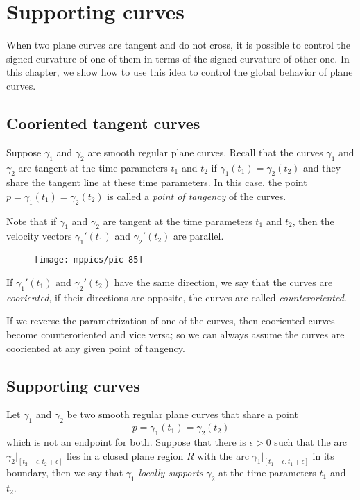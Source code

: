 \chapter{Supporting curves}
\label{chap:supporting-curves}

When two plane curves are tangent and do not cross, it is possible to control the signed curvature of one of them in terms of the signed curvature of other one.
In this chapter, we show how to use this idea to control the global behavior of plane curves.

\section{Cooriented tangent curves}

Suppose $\gamma_1$ and $\gamma_2$ are smooth regular plane curves.
Recall that the curves $\gamma_1$ and $\gamma_2$ are tangent at the  time parameters $t_1$ and $t_2$
if $\gamma_1(t_1)=\gamma_2(t_2)$
and they share the tangent line at these time parameters.
In this case, the point $p=\gamma_1(t_1)=\gamma_2(t_2)$ is called a \emph{point of tangency} of the curves.

Note that if $\gamma_1$ and $\gamma_2$ are tangent at the time parameters $t_1$ and $t_2$, 
then the velocity vectors $\gamma_1'(t_1)$ and $\gamma_2'(t_2)$ are parallel.
\begin{figure}[!ht]
\vskip-0mm
\centering
\texttt{[image: mppics/pic-85]}
\vskip0mm
\end{figure}
If $\gamma_1'(t_1)$ and $\gamma_2'(t_2)$ have the same direction, we say that the curves are \emph{cooriented},
if their directions are opposite, the curves are called \emph{counteroriented}.

If we reverse the parametrization of one of the curves, then cooriented curves become counteroriented and vice versa; so we can always assume the curves are cooriented at any given point of tangency.

\section{Supporting curves}

Let $\gamma_1$ and $\gamma_2$ be two smooth regular plane curves that share a point 
\[p=\gamma_1(t_1)=\gamma_2(t_2)\] 
which is not an endpoint for both.
Suppose that there is $\epsilon>0$ such that the arc $\gamma_2|_{[t_2-\epsilon, t_2+\epsilon]}$ lies in a closed plane region $R$ with the arc $\gamma_1|_{[t_1-\epsilon, t_1+\epsilon]}$ in its boundary,
then we say that $\gamma_1$ \emph{locally supports} $\gamma_2$ at the time parameters $t_1$ and $t_2$.

